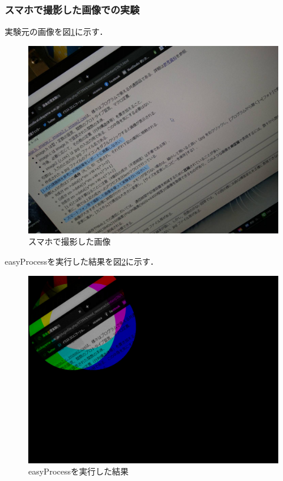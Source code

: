 \documentclass[11pt]{jarticle}
\begin{document}
\subsubsection{スマホで撮影した画像での実験}
実験元の画像を図\ref{196585.jpg}に示す．
\begin{figure}[htbp]
    \centering
    \includegraphics[scale=.1]{196585.jpg}
    \caption{スマホで撮影した画像}
    \label{196585.jpg}
\end{figure}

easyProcessを実行した結果を図\ref{a3.jpg}に示す．
\begin{figure}[htbp]
    \centering
    \includegraphics[scale=.1]{a3.jpg}
    \caption{easyProcessを実行した結果}
    \label{a3.jpg}
\end{figure}
\end{document}
